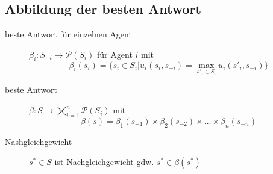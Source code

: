 \subsection{Abbildung der besten Antwort}
	\begin{description}
		\item[beste Antwort für einzelnen Agent] $\beta_{i}:S_{-i}\rightarrow\mathcal{P}(S_i)$ für Agent $i$ mit
			\[\beta_{i}(s_i)=\{s_i\in S_i|u_i(s_i,s_{-i})=\max\limits_{s'_i\in S_i} u_i(s'_i,s_{-i})\}\]
		\item[beste Antwort] $\beta:S\rightarrow\bigtimes\limits_{i=1}^n\mathcal{P}(S_i)$ mit
			\[\beta(s)=\beta_1(s_{-1})\times\beta_2(s_{-2})\times\dots\times\beta_n(s_{-n})\]
		\item[Nashgleichgewicht] $s^{*}\in S$ ist Nachgleichgewicht gdw. $s^{*}\in \beta(s^{*})$
	\end{description}
\topbreak
\vspace*{-2\baselineskip}
